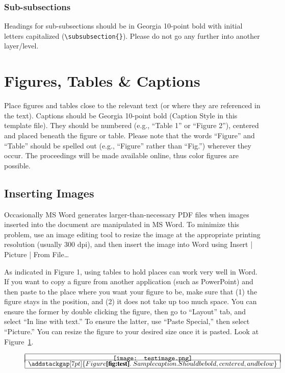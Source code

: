 \documentclass{icis}
\begin{document}
\subsubsection{Sub-subsections}
Headings for sub-subsections should be in Georgia 10-point bold with initial
letters capitalized (\texttt{\textbackslash subsubsection\{\}}). Please do not
go any further into another layer/level.

\section{Figures, Tables \& Captions}
Place figures and tables close to the relevant text (or where they are
referenced in the text).  Captions should be Georgia 10-point bold (Caption
Style in this template file).  They should be numbered (e.g., ``Table 1'' or
``Figure 2''), centered and placed beneath the figure or table.  Please note that
the words ``Figure'' and ``Table'' should be spelled out (e.g., ``Figure'' rather than ``Fig.'') wherever they occur. The proceedings will be made available online, thus color figures are possible.

\subsection{Inserting Images}
Occasionally MS Word generates larger-than-necessary PDF files when images
inserted into the document are manipulated in MS Word. To minimize this
problem, use an image editing tool to resize the image at the appropriate
printing resolution (usually 300 dpi), and then insert the image into Word using
Insert | Picture | From File\ldots

As indicated in Figure 1, using tables to hold places can work very well in
Word. If you want to copy a figure from another application (such as PowerPoint)
and then paste to the place where you want your figure to be, make sure that (1)
the figure stays in the position, and (2) it does not take up too much
space. You can ensure the former by double clicking the figure, then go to
``Layout'' tab, and select ``In line with text.'' To ensure the latter, use ``Paste
Special,'' then select ``Picture.'' You can resize the figure to your desired size
once it is pasted. Look at Figure~\ref{fig:test}.

\vspace{-0.2cm}
\begin{figure}[h]
	\[
	\begin{array}{|c|}
	\hline \\ [-11pt]
	\texttt{[image: testimage.png]} \\ [-4pt]
	\hline
	\addstackgap[7pt]{{\usefont{T1}{ptm}{b}{n}Figure \ref{fig:test}.\hspace{0.09cm} Sample caption. Should be bold, centered, and below}}\\
	\hline
	\end{array}
	\]
	\captionsetup{labelformat=empty}
	\caption{}\label{fig:test} %
\end{figure}
\vspace{-0.9cm}
\end{document}
